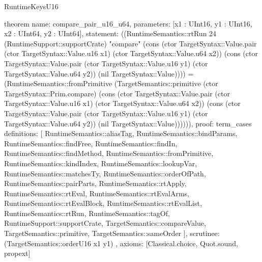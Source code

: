 \begin{lexlean}{RuntimeKeysU16}
\begin{semanticmodule}
theorem{
  name: compare_pair_u16_u64,
  parameters: [x1 : UInt16, y1 : UInt16, x2 : UInt64, y2 : UInt64],
  statement: ((RuntimeSemantics::rtRun 24 (RuntimeSupport::supportCrate) "compare" (cons (ctor TargetSyntax::Value.pair (ctor TargetSyntax::Value.u16 x1) (ctor TargetSyntax::Value.u64 x2)) (cons (ctor TargetSyntax::Value.pair (ctor TargetSyntax::Value.u16 y1) (ctor TargetSyntax::Value.u64 y2)) (nil TargetSyntax::Value)))) = (RuntimeSemantics::fromPrimitive (TargetSemantics::primitive (ctor TargetSyntax::Prim.compare) (cons (ctor TargetSyntax::Value.pair (ctor TargetSyntax::Value.u16 x1) (ctor TargetSyntax::Value.u64 x2)) (cons (ctor TargetSyntax::Value.pair (ctor TargetSyntax::Value.u16 y1) (ctor TargetSyntax::Value.u64 y2)) (nil TargetSyntax::Value)))))),
  proof: term_cases{
    definitions: [
      RuntimeSemantics::aliasTag,
      RuntimeSemantics::bindParams,
      RuntimeSemantics::findFree,
      RuntimeSemantics::findIn,
      RuntimeSemantics::findMethod,
      RuntimeSemantics::fromPrimitive,
      RuntimeSemantics::kindIndex,
      RuntimeSemantics::lookupVar,
      RuntimeSemantics::matchesTy,
      RuntimeSemantics::orderOfPath,
      RuntimeSemantics::pairParts,
      RuntimeSemantics::rtApply,
      RuntimeSemantics::rtEval,
      RuntimeSemantics::rtEvalArms,
      RuntimeSemantics::rtEvalBlock,
      RuntimeSemantics::rtEvalList,
      RuntimeSemantics::rtRun,
      RuntimeSemantics::tagOf,
      RuntimeSupport::supportCrate,
      TargetSemantics::compareValue,
      TargetSemantics::primitive,
      TargetSemantics::sameOrder
    ],
    scrutinee: (TargetSemantics::orderU16 x1 y1)
  },
  axioms: [Classical.choice, Quot.sound, propext]
}


\end{semanticmodule}
\end{lexlean}
